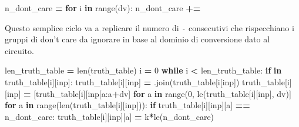 \documentclass[
  italian,
]{book}
\newenvironment{Shaded}{\begin{snugshade}}{\end{snugshade}}
\newcommand{\BuiltInTok}[1]{#1}
\newcommand{\ControlFlowTok}[1]{\textcolor[rgb]{0.13,0.29,0.53}{\textbf{#1}}}
\newcommand{\DecValTok}[1]{\textcolor[rgb]{0.00,0.00,0.81}{#1}}
\newcommand{\KeywordTok}[1]{\textcolor[rgb]{0.13,0.29,0.53}{\textbf{#1}}}
\newcommand{\NormalTok}[1]{#1}
\newcommand{\OperatorTok}[1]{\textcolor[rgb]{0.81,0.36,0.00}{\textbf{#1}}}
\newcommand{\StringTok}[1]{\textcolor[rgb]{0.31,0.60,0.02}{#1}}
\begin{document}
\begin{Shaded}
\begin{Highlighting}[]
\NormalTok{n\_dont\_care }\OperatorTok{=} \StringTok{\textquotesingle{}\textquotesingle{}}
    \ControlFlowTok{for}\NormalTok{ i }\KeywordTok{in} \BuiltInTok{range}\NormalTok{(dv):}
\NormalTok{        n\_dont\_care }\OperatorTok{+=} \StringTok{\textquotesingle{}{-}\textquotesingle{}}
\end{Highlighting}
\end{Shaded}

\newpage

Questo semplice ciclo va a replicare il numero di \texttt{-} consecutivi che rispecchiano i gruppi di don't care da ignorare in base al dominio di conversione dato al circuito.

\begin{Shaded}
\begin{Highlighting}[]
\NormalTok{len\_truth\_table }\OperatorTok{=} \BuiltInTok{len}\NormalTok{(truth\_table)}
\NormalTok{i }\OperatorTok{=} \DecValTok{0}
\ControlFlowTok{while}\NormalTok{ i }\OperatorTok{\textless{}}\NormalTok{ len\_truth\_table:}
    \ControlFlowTok{if} \StringTok{\textquotesingle{}{-}\textquotesingle{}} \KeywordTok{in}\NormalTok{ truth\_table[i][}\StringTok{\textquotesingle{}inp\textquotesingle{}}\NormalTok{]:}
\NormalTok{        truth\_table[i][}\StringTok{\textquotesingle{}inp\textquotesingle{}}\NormalTok{] }\OperatorTok{=} \StringTok{\textquotesingle{}\textquotesingle{}}\NormalTok{.join(truth\_table[i[}\StringTok{\textquotesingle{}inp\textquotesingle{}}\NormalTok{])}
\NormalTok{        truth\_table[i][}\StringTok{\textquotesingle{}inp\textquotesingle{}}\NormalTok{] }\OperatorTok{=}\NormalTok{ [truth\_table[i][}\StringTok{\textquotesingle{}inp\textquotesingle{}}\NormalTok{[a:a}\OperatorTok{+}\NormalTok{dv]}
                                 \ControlFlowTok{for}\NormalTok{ a }\KeywordTok{in} \BuiltInTok{range}\NormalTok{(}\DecValTok{0}\NormalTok{, le(truth\_table[i][}\StringTok{\textquotesingle{}inp\textquotesingle{}}\NormalTok{], dv)]}
        \ControlFlowTok{for}\NormalTok{ a }\KeywordTok{in} \BuiltInTok{range}\NormalTok{(}\BuiltInTok{len}\NormalTok{(truth\_table[i][}\StringTok{\textquotesingle{}inp\textquotesingle{}}\NormalTok{])):}
            \ControlFlowTok{if}\NormalTok{ truth\_table[i][}\StringTok{\textquotesingle{}inp\textquotesingle{}}\NormalTok{][a] }\OperatorTok{==}\NormalTok{ n\_dont\_care:}
\NormalTok{                truth\_table[i][}\StringTok{\textquotesingle{}inp\textquotesingle{}}\NormalTok{][a] }\OperatorTok{=} \StringTok{\textquotesingle{}k\textquotesingle{}}\OperatorTok{*}\NormalTok{le(n\_dont\_care)}

\end{Highlighting}
\end{Shaded}
\end{document}
